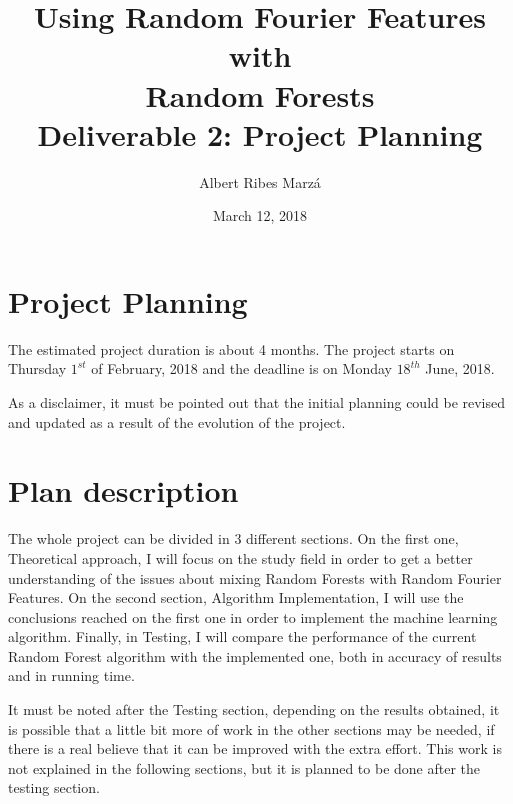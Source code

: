 \documentclass[a4paper]{article}
\title{
Using Random Fourier Features with \\ Random Forests \\
\large Deliverable 2: Project Planning}
\author{Albert Ribes Marzá}
\date{March 12, 2018}
\begin{document}
    \maketitle
    \pagebreak

    \tableofcontents
    \pagebreak

    \section{Project Planning}

    The estimated project duration is about 4 months. The project starts on Thursday \(1^{st}\) of February, 2018 and the deadline is on Monday \(18^{th}\) June, 2018.

    As a disclaimer, it must be pointed out that the initial planning could be revised and updated as a result of the evolution of the project.


    \section{Plan description}

    The whole project can be divided in 3 different sections. On the first one, Theoretical approach, I will focus on the study field in order to get a better understanding of the issues about mixing Random Forests with Random Fourier Features. On the second section, Algorithm Implementation, I will use the conclusions reached on the first one in order to implement the machine learning algorithm. Finally, in Testing, I will compare the performance of the current Random Forest algorithm with the implemented one, both in accuracy of results and in running time.

    It must be noted after the Testing section, depending on the results obtained, it is possible that a little bit more of work in the other sections may be needed, if there is a real believe that it can be improved with the extra effort. This work is not explained in the following sections, but it is planned to be done after the testing section.
\end{document}
